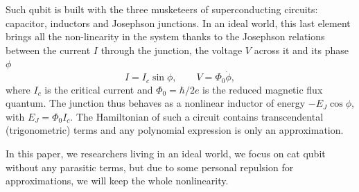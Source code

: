 \documentclass[aps,prx,reprint,floatfix,amsmath,amssymb,longbibliography]{revtex4-2}
\begin{document}
Such qubit is built with the three musketeers of superconducting circuits: capacitor, inductors and Josephson junctions. In an ideal world, this last element brings all the non-linearity in the system thanks to the Josephson relations between the current $I$ through the junction, the voltage $V$ across it and its phase $\phi$
\begin{equation}
    I = I_c\sin\phi,\qquad V=\Phi_0\dot\phi,
\end{equation}
where $I_c$ is the critical current and $\Phi_0=\hbar/2e$ is the reduced magnetic flux quantum. The junction thus behaves as a nonlinear inductor of energy $-E_J\cos\phi$, with $E_J=\Phi_0I_c$. The Hamiltonian of such a circuit contains transcendental (trigonometric) terms and any polynomial expression is only an approximation.

In this paper, we researchers living in an ideal world, we focus on cat qubit without any parasitic terms, but due to some personal repulsion for approximations, we will keep the whole nonlinearity.
\end{document}
